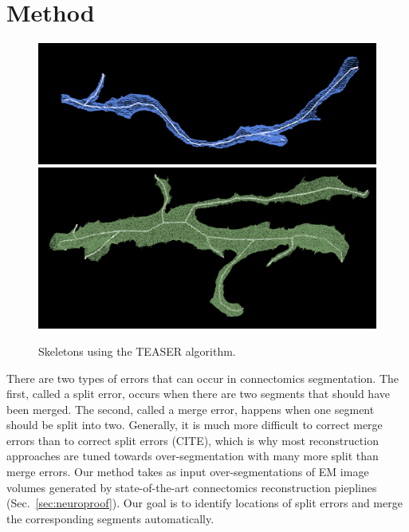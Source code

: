 \section{Method}

\begin{figure}[t]
	\centering
	\includegraphics[width=0.92\linewidth]{./figures/skeleton1.png}
	\includegraphics[width=0.92\linewidth]{./figures/skeleton2.png}
	\caption{Skeletons using the TEASER algorithm.}
	\label{fig:skeletonization}
\end{figure}

There are two types of errors that can occur in connectomics segmentation.
The first, called a split error, occurs when there are two segments that should have been merged. The second, called a merge error, happens when one segment should be split into two. Generally, it is much more difficult to correct merge errors than to correct split errors (CITE), which is why most reconstruction approaches are tuned towards over-segmentation with many more split than merge errors. Our method takes as input over-segmentations of EM image volumes generated by state-of-the-art connectomics reconstruction pieplines (Sec.~\ref{sec:neuroproof}). Our goal is to identify locations of split errors and merge the corresponding segments automatically.

